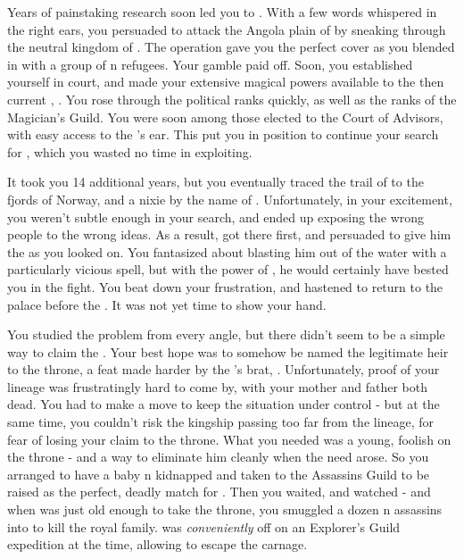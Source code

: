 \documentclass[char]{NeptuneBall}
\begin{document}
Years of painstaking research soon led you to \pAtlantis{}. With a few words whispered in the right ears, you persuaded \pPacifica{} to attack the Angola plain of \pAtlantis{} by sneaking through the neutral kingdom of \pIndia{}. The operation gave you the perfect cover as you blended in with a group of \pAtlantis{}n refugees. Your gamble paid off. Soon, you established yourself in court, and made your extensive magical powers available to the then current \cExKing{\King}, \cExKing{}. You rose through the political ranks quickly, as well as the ranks of the Magician's Guild. You were soon among those elected to the Court of Advisors, with easy access to the \cExKing{\King}'s ear. This put you in position to continue your search for \iTrident{\MYname}, which you wasted no time in exploiting.

It took you 14 additional years, but you eventually traced the trail of \iTrident{\MYname} to the fjords of Norway, and a nixie by the name of \cNixie{}. Unfortunately, in your excitement, you weren't subtle enough in your search, and ended up exposing the wrong people to the wrong ideas. As a result, \cExKing{} got there first, and persuaded \cNixie{} to give him the \iTrident{\MYname} as you looked on. You fantasized about blasting him out of the water with a particularly vicious spell, but with the power of \iTrident{\MYname}, he would certainly have bested you in the fight. You beat down your frustration, and hastened to return to the palace before the \cExKing{\King}. It was not yet time to show your hand.

You studied the problem from every angle, but there didn't seem to be a simple way to claim the \iTrident{\MYname}. Your best hope was to somehow be named the legitimate heir to the throne, a feat made harder by the \cExKing{\King}'s brat, \cKing{}. Unfortunately, proof of your lineage was frustratingly hard to come by, with your mother and father both dead. You had to make a move to keep the situation under control - but at the same time, you couldn't risk the kingship passing too far from the \cExExKing{} lineage, for fear of losing your claim to the throne. What you needed was a young, foolish \cKing{\King} on the throne - and a way to eliminate him cleanly when the need arose. So you arranged to have a baby \pAtlantis{}n \cQueen{\kid} kidnapped and taken to the Assassins Guild to be raised as the perfect, deadly match for \cKing{}. Then you waited, and watched - and when \cKing{} was just old enough to take the throne, you smuggled a dozen \pPacifica{}n assassins into \pAtlantis{} to kill the royal family. \cKing{} was \emph{conveniently} off on an Explorer's Guild expedition at the time, allowing \cKing{\them} to escape the carnage.
\end{document}
